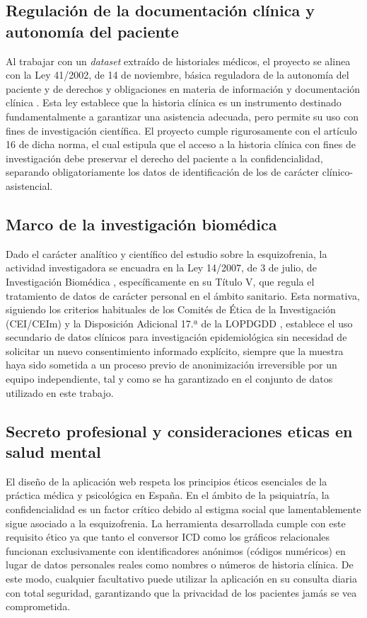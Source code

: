 \documentclass[12pt,a4paper,onecolumn,oneside]{report}
\begin{document}
\subsection{Regulación de la documentación clínica y autonomía del paciente}
Al trabajar con un \textit{dataset} extraído de historiales médicos, el proyecto se alinea con la Ley 41/2002, de 14 de noviembre, básica reguladora de la autonomía del paciente y de derechos y obligaciones en materia de información y documentación clínica \cite{ley41_2002}. Esta ley establece que la historia clínica es un instrumento destinado fundamentalmente a garantizar una asistencia adecuada, pero permite su uso con fines de investigación científica. El proyecto cumple rigurosamente con el artículo 16 de dicha norma, el cual estipula que el acceso a la historia clínica con fines de investigación debe preservar el derecho del paciente a la confidencialidad, separando obligatoriamente los datos de identificación de los de carácter clínico-asistencial.

\subsection{Marco de la investigación biomédica}
Dado el carácter analítico y científico del estudio sobre la esquizofrenia, la actividad investigadora se encuadra en la Ley 14/2007, de 3 de julio, de Investigación Biomédica \cite{ley14_2007}, específicamente en su Título V, que regula el tratamiento de datos de carácter personal en el ámbito sanitario. Esta normativa, siguiendo los criterios habituales de los Comités de Ética de la Investigación (CEI/CEIm) \cite{ley14_2007_cei} y la Disposición Adicional 17.ª de la LOPDGDD \cite{rd1090_2015_ceim}, establece el uso secundario de datos clínicos para investigación epidemiológica sin necesidad de solicitar un nuevo consentimiento informado explícito, siempre que la muestra haya sido sometida a un proceso previo de anonimización irreversible por un equipo independiente, tal y como se ha garantizado en el conjunto de datos utilizado en este trabajo.

\subsection{Secreto profesional y consideraciones eticas en salud mental}
El diseño de la aplicación web respeta los principios éticos esenciales de la práctica médica y psicológica en España. En el ámbito de la psiquiatría, la confidencialidad es un factor crítico debido al estigma social que lamentablemente sigue asociado a la esquizofrenia. La herramienta desarrollada cumple con este requisito ético ya que tanto el conversor ICD como los gráficos relacionales funcionan exclusivamente con identificadores anónimos (códigos numéricos) en lugar de datos personales reales como nombres o números de historia clínica. De este modo, cualquier facultativo puede utilizar la aplicación en su consulta diaria con total seguridad, garantizando que la privacidad de los pacientes jamás se vea comprometida.
\end{document}
